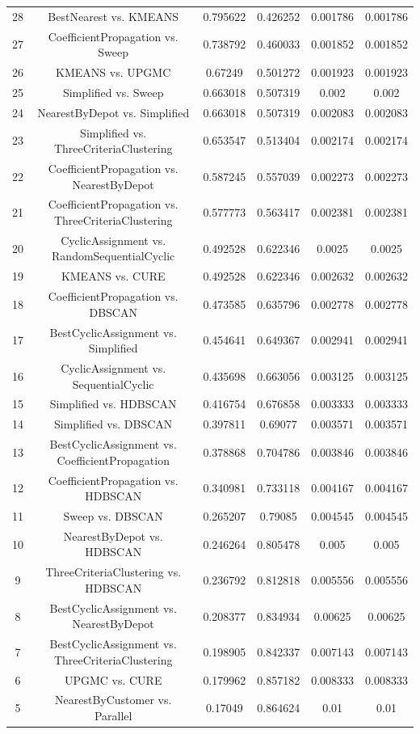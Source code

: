 \documentclass[a4paper,10pt]{article}
\begin{document}
\begin{landscape}
\begin{table}[!htp]
\begin{tabular}{cccccc}
28&BestNearest vs. KMEANS&0.795622&0.426252&0.001786&0.001786\\
27&CoefficientPropagation vs. Sweep&0.738792&0.460033&0.001852&0.001852\\
26&KMEANS vs. UPGMC&0.67249&0.501272&0.001923&0.001923\\
25&Simplified vs. Sweep&0.663018&0.507319&0.002&0.002\\
24&NearestByDepot vs. Simplified&0.663018&0.507319&0.002083&0.002083\\
23&Simplified vs. ThreeCriteriaClustering&0.653547&0.513404&0.002174&0.002174\\
22&CoefficientPropagation vs. NearestByDepot&0.587245&0.557039&0.002273&0.002273\\
21&CoefficientPropagation vs. ThreeCriteriaClustering&0.577773&0.563417&0.002381&0.002381\\
20&CyclicAssignment vs. RandomSequentialCyclic&0.492528&0.622346&0.0025&0.0025\\
19&KMEANS vs. CURE&0.492528&0.622346&0.002632&0.002632\\
18&CoefficientPropagation vs. DBSCAN&0.473585&0.635796&0.002778&0.002778\\
17&BestCyclicAssignment vs. Simplified&0.454641&0.649367&0.002941&0.002941\\
16&CyclicAssignment vs. SequentialCyclic&0.435698&0.663056&0.003125&0.003125\\
15&Simplified vs. HDBSCAN&0.416754&0.676858&0.003333&0.003333\\
14&Simplified vs. DBSCAN&0.397811&0.69077&0.003571&0.003571\\
13&BestCyclicAssignment vs. CoefficientPropagation&0.378868&0.704786&0.003846&0.003846\\
12&CoefficientPropagation vs. HDBSCAN&0.340981&0.733118&0.004167&0.004167\\
11&Sweep vs. DBSCAN&0.265207&0.79085&0.004545&0.004545\\
10&NearestByDepot vs. HDBSCAN&0.246264&0.805478&0.005&0.005\\
9&ThreeCriteriaClustering vs. HDBSCAN&0.236792&0.812818&0.005556&0.005556\\
8&BestCyclicAssignment vs. NearestByDepot&0.208377&0.834934&0.00625&0.00625\\
7&BestCyclicAssignment vs. ThreeCriteriaClustering&0.198905&0.842337&0.007143&0.007143\\
6&UPGMC vs. CURE&0.179962&0.857182&0.008333&0.008333\\
5&NearestByCustomer vs. Parallel&0.17049&0.864624&0.01&0.01\\

\end{tabular}
\end{table}
\end{landscape}
\end{document}

